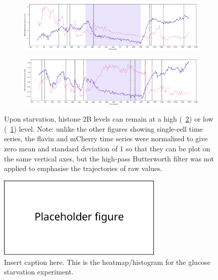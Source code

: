 \begin{figure}
  \centering
  \begin{subfigure}[htpb]{1.0\textwidth}
   \centering
   \includegraphics[width=\textwidth]{starvation_raw_13-39-01.pdf}
   \caption{
   }
   \label{fig:biology-starvation-raw-2}
  \end{subfigure}

  \begin{subfigure}[htpb]{1.0\textwidth}
   \centering
   \includegraphics[width=\textwidth]{starvation_raw_13-07-02.pdf}
   \caption{
   }
   \label{fig:biology-starvation-raw-1}
  \end{subfigure}

  \caption{
    Upon starvation, histone 2B levels can remain at a high (~\ref{fig:biology-starvation-raw-1}) or low (~\ref{fig:biology-starvation-raw-2}) level.
    Note: unlike the other figures showing single-cell time series, the flavin and mCherry time series were normalised to give zero mean and standard deviation of 1 so that they can be plot on the same vertical axes, but the high-pass Butterworth filter was not applied to emphasise the trajectories of raw values.
  }
  \label{fig:biology-starvation-raw}
\end{figure}


\begin{figure}
  \centering
  \includegraphics[width=0.7\textwidth]{placeholder01.pdf}
  \caption{
    Insert caption here.
    This is the heatmap/histogram for the glucose starvation experiment.
  }
  \label{fig:biology-starvation-heatmap}
\end{figure}

